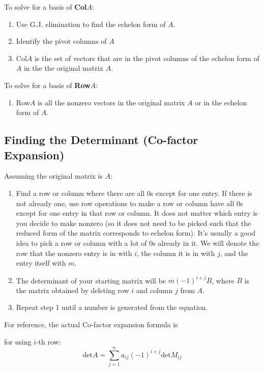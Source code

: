 \documentclass[a4paper,12pt]{article}
\theoremstyle{definition}
\theoremstyle{definition}
\begin{document}
	To solve for a basis of \textbf{Col}$A$:
	\begin{enumerate}
		\item Use G.J. elimination to find the echelon form of $A$.
		
		\item Identify the pivot columns of $A$
		
		\item Col$A$ is the set of vectors that are in the pivot columns of the echelon form of $A$ in the the original matrix $A$.
	\end{enumerate}
	
	To solve for a basis of \textbf{Row}$A$:
	\begin{enumerate}
		\item Row$A$ is all the nonzero vectors in the original matrix $A$ or in the echelon form of $A$.
	\end{enumerate}
	
	\subsection{Finding the Determinant (Co-factor Expansion)}
	\label{sec:co-factor-exp}
	
	Assuming the original matrix is $A$:
	\begin{enumerate}
		\item Find a row or column where there are all 0s except for one entry. If there is not already one, use row operations to make a row or column have all 0s except for one entry in that row or column. It does not matter which entry is you decide to make nonzero (so it does not need to be picked such that the reduced form of the matrix corresponds to echelon form). It's usually a good idea to pick a row or column with a lot of 0s already in it. We will denote the row that the nonzero entry is in with $i$, the column it is in with $j$, and the entry itself with $m$.
		
		\item The determinant of your starting matrix will be  $m(-1)^{i + j}B$, where $B$ is the matrix obtained by deleting row $i$ and column $j$ from $A$.
		
		\item Repeat step 1 until a number is generated from the equation.
	\end{enumerate}
	
	For reference, the actual Co-factor expansion formula is
	
	for using $i$-th row:
	\begin{equation*}
		\text{det}A = \sum_{j = 1}^{n}a_{ij}(-1)^{i + j}\text{det}M_{ij}
	\end{equation*}
	
\end{document}
